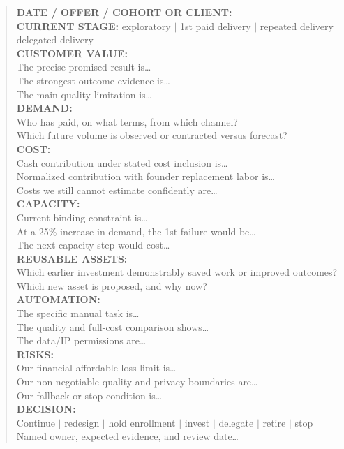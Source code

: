 \begin{quote}
\small
\textbf{DATE / OFFER / COHORT OR CLIENT:}\\
\textbf{CURRENT STAGE:} exploratory $|$ 1st paid delivery $|$ repeated delivery $|$ delegated delivery\\[1ex]
\textbf{CUSTOMER VALUE:}\\
The precise promised result is\dots\\
The strongest outcome evidence is\dots\\
The main quality limitation is\dots\\[1ex]
\textbf{DEMAND:}\\
Who has paid, on what terms, from which channel?\\
Which future volume is observed or contracted versus forecast?\\[1ex]
\textbf{COST:}\\
Cash contribution under stated cost inclusion is\dots\\
Normalized contribution with founder replacement labor is\dots\\
Costs we still cannot estimate confidently are\dots\\[1ex]
\textbf{CAPACITY:}\\
Current binding constraint is\dots\\
At a 25\% increase in demand, the 1st failure would be\dots\\
The next capacity step would cost\dots\\[1ex]
\textbf{REUSABLE ASSETS:}\\
Which earlier investment demonstrably saved work or improved outcomes?\\
Which new asset is proposed, and why now?\\[1ex]
\textbf{AUTOMATION:}\\
The specific manual task is\dots\\
The quality and full-cost comparison shows\dots\\
The data/IP permissions are\dots\\[1ex]
\textbf{RISKS:}\\
Our financial affordable-loss limit is\dots\\
Our non-negotiable quality and privacy boundaries are\dots\\
Our fallback or stop condition is\dots\\[1ex]
\textbf{DECISION:}\\
Continue $|$ redesign $|$ hold enrollment $|$ invest $|$ delegate $|$ retire $|$ stop\\
Named owner, expected evidence, and review date\dots
\end{quote}
